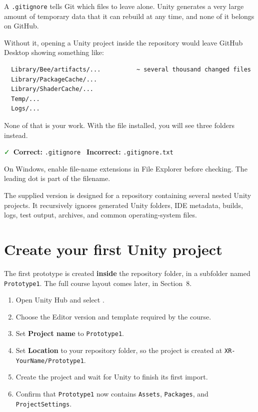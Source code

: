 \documentclass[11pt,a4paper]{article}
\newcommand{\yes}{\textcolor{Green}{\faCheck}}
\newcommand{\no}{\textcolor{Red}{\faTimes}}
\newcommand{\button}[1]{\tcbox[on line,colback=white,colframe=Rule,boxrule=.5pt,
  arc=1mm,left=1.5mm,right=1.5mm,top=.6mm,bottom=.6mm]{\small\bfseries #1}}
\newcommand{\pathbit}[1]{\texttt{#1}}
\begin{document}
A \pathbit{.gitignore} tells Git which files to leave alone. Unity generates a very large
amount of temporary data that it can rebuild at any time, and none of it belongs on
GitHub.

\begin{plainbox}
Without it, opening a Unity project inside the repository would leave GitHub Desktop
showing something like:
\begin{verbatim}
  Library/Bee/artifacts/...          ~ several thousand changed files
  Library/PackageCache/...
  Library/ShaderCache/...
  Temp/...
  Logs/...
\end{verbatim}
None of that is your work. With the file installed, you will see three folders instead.
\end{plainbox}

\begin{warnbox}
\yes~\textbf{Correct:} \pathbit{.gitignore}\qquad
\no~\textbf{Incorrect:} \pathbit{.gitignore.txt}

On Windows, enable file-name extensions in File Explorer before checking. The leading dot
is part of the filename.
\end{warnbox}

The supplied version is designed for a repository containing several nested Unity
projects. It recursively ignores generated Unity folders, IDE metadata, builds, logs, test
output, archives, and common operating-system files.

\section{Create your first Unity project}

The first prototype is created \textbf{inside} the repository folder, in a subfolder named
\pathbit{Prototype1}. The full course layout comes later, in Section~8.

\begin{enumerate}
\item Open Unity Hub and select \button{New project}.
\item Choose the Editor version and template required by the course.
\item Set \textbf{Project name} to \pathbit{Prototype1}.
\item Set \textbf{Location} to your repository folder, so the project is created at
\pathbit{XR-YourName/Prototype1}.
\item Create the project and wait for Unity to finish its first import.
\item Confirm that \pathbit{Prototype1} now contains \pathbit{Assets},
\pathbit{Packages}, and \pathbit{ProjectSettings}.
\end{enumerate}
\end{document}

